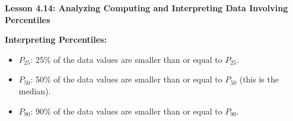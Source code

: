 \begin{center}
\textbf{Lesson 4.14: Analyzing Computing and Interpreting Data Involving Percentiles}
\end{center}

\vspace*{-1.5ex}

\noindent\textbf{Interpreting Percentiles:}  
\begin{itemize}
    \item \(P_{25}\): 25\% of the data values are smaller than or equal to \(P_{25}\).  
    \item \(P_{50}\): 50\% of the data values are smaller than or equal to \(P_{50}\) (this is the median).  
    \item \(P_{90}\): 90\% of the data values are smaller than or equal to \(P_{90}\).  
\end{itemize}
